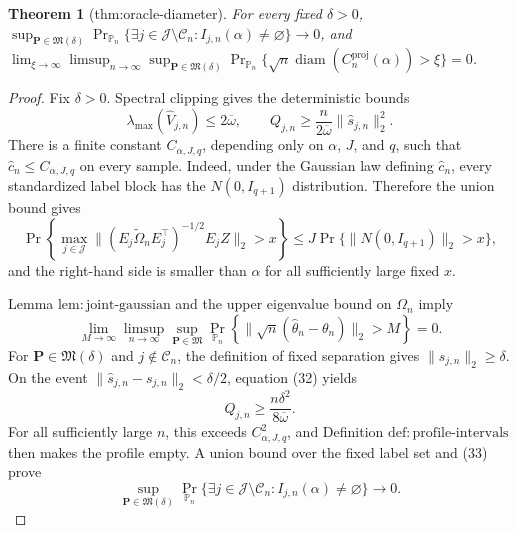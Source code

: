 \documentclass{article}
\newtheorem{theorem}{Theorem}
\begin{document}
\begin{theorem}[thm:oracle-diameter]\label{thm:oracle-diameter}
For every fixed \(\delta>0\), \(\sup_{\mathbf P\in\mathfrak M(\delta)}\Pr_{\mathbb P_n}\{\exists j\in\mathcal J\setminus\mathcal C_n:I_{j,n}(\alpha)\ne\varnothing\}\to0\), and \(\lim_{\xi\to\infty}\limsup_{n\to\infty}\sup_{\mathbf P\in\mathfrak M(\delta)}\Pr_{\mathbb P_n}\{\sqrt n\operatorname{diam}(C_n^{\mathrm{proj}}(\alpha))>\xi\}=0\).
\end{theorem}
\begin{proof}
Fix \(\delta>0\).  Spectral clipping gives the deterministic bounds
\[
 \lambda_{\max}(\widehat V_{j,n})\le2\overline\omega,
 \qquad
 Q_{j,n}\ge\frac n{2\overline\omega}
                 \|\widehat s_{j,n}\|_2^2.
\tag{32}
\]
There is a finite constant \(C_{\alpha,J,q}\), depending only on \(\alpha\), \(J\), and \(q\), such that \(\widehat c_n\le C_{\alpha,J,q}\) on every sample.  Indeed, under the Gaussian law defining \(\widehat c_n\), every standardized label block has the \(N(0,I_{q+1})\) distribution.  Therefore the union bound gives
\[
 \Pr\left\{
  \max_{j\in\mathcal J}
  \|(E_j\widetilde\Omega_nE_j^{\top})^{-1/2}E_jZ\|_2>x
 \right\}
 \le J\Pr\{\|N(0,I_{q+1})\|_2>x\},
\]
and the right-hand side is smaller than \(\alpha\) for all sufficiently large fixed \(x\).

Lemma \(\mathrm{lem:joint\text{-}gaussian}\) and the upper eigenvalue bound on \(\Omega_n\) imply
\[
 \lim_{M\to\infty}\limsup_{n\to\infty}
 \sup_{\mathbf P\in\mathfrak M}
 \Pr_{\mathbb P_n}\!\left\{
 \|\sqrt n(\widehat\theta_n-\theta_n)\|_2>M
 \right\}=0.
\tag{33}
\]
For \(\mathbf P\in\mathfrak M(\delta)\) and \(j\notin\mathcal C_n\), the definition of fixed separation gives \(\|s_{j,n}\|_2\ge\delta\).  On the event
\(
 \|\widehat s_{j,n}-s_{j,n}\|_2<\delta/2
\), equation (32) yields
\[
 Q_{j,n}\ge\frac{n\delta^2}{8\overline\omega}.
\]
For all sufficiently large \(n\), this exceeds \(C_{\alpha,J,q}^2\), and Definition \(\mathrm{def:profile\text{-}intervals}\) then makes the profile empty.  A union bound over the fixed label set and (33) prove
\[
 \sup_{\mathbf P\in\mathfrak M(\delta)}
 \Pr_{\mathbb P_n}\{\exists j\in\mathcal J\setminus\mathcal C_n:
 I_{j,n}(\alpha)\ne\varnothing\}\longrightarrow0.
\tag{34}
\]


\end{proof}
\end{document}
